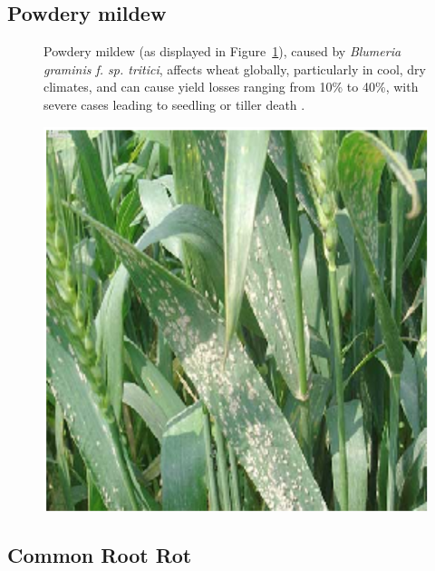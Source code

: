 \subsection{Powdery mildew} 

\begin{figure}[H]
    \centering
    \begin{minipage}{0.55\textwidth}
        \small
        Powdery mildew (as displayed in Figure~\ref{fig:Figure09}), caused by \textit{Blumeria graminis f. sp. tritici}, affects wheat globally, particularly in cool, dry climates, and can cause yield losses ranging from 10\% to 40\%, with severe cases leading to seedling or tiller death \parencite{singh2023wheat}.
    \end{minipage}%
    \hfill
    \begin{minipage}{0.4\textwidth}
        \centering
        \includegraphics[width=0.5\linewidth]{chapters/chapter2/images/Figure09.png}
        \label{fig:Figure09}
    \end{minipage}
\end{figure}

\subsection{Common Root Rot}


